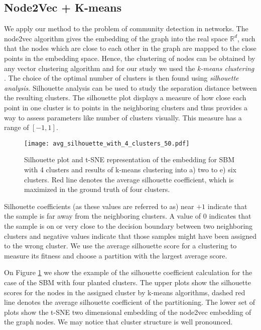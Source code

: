 \subsection{Node2Vec + K-means}
We apply our method to the problem of community detection in networks. The node2vec algorithm gives the embedding of the graph into the real space $\mathbb{R}^d$, such that the nodes which are close to each other in the graph are mapped to the close points in the embedding space. Hence, the clustering of nodes can be obtained by any vector clustering algorithm and for our study we used the \textit{k-means clustering} \cite{Macqueen1967}. The choice of the optimal number of clusters is then found using \textit{silhouette analysis}. Silhouette analysis can be used to study the separation distance between the resulting clusters. The silhouette plot displays a measure of how close each point in one cluster is to points in the neighboring clusters and thus provides a way to assess parameters like number of clusters visually. This measure has a range of $[-1, 1]$. 
\begin{figure}[ht]
 \centering
    \texttt{[image: avg\_silhouette\_with\_4\_clusters\_50.pdf]}
   \caption{Silhouette plot and t-SNE representation of the embedding for SBM with 4 clusters and results of k-means clustering into a) two to e) six clusters. Red line denotes the average silhouette coefficient, which is maximized in the ground truth of four clusters.}
   \label{fig:silhouette_example}
 \end{figure}

Silhouette coefficients (as these values are referred to as) near $+1$ indicate that the sample is far away from the neighboring clusters. A value of $0$ indicates that the sample is on or very close to the decision boundary between two neighboring clusters and negative values indicate that those samples might have been assigned to the wrong cluster. We use the average silhouette score for a clustering to measure its fitness and choose a partition with the largest average score. 

On Figure \ref{fig:silhouette_example} we show the example of the silhouette coefficient calculation for the case of the SBM with four planted clusters. The upper plots show the silhouette scores for the nodes in the assigned cluster by k-means algorithms, dashed red line denotes the average silhouette coefficient of the partitioning. The lower set of plots show the t-SNE two dimensional embedding of the node2vec embedding of the graph nodes. We may notice that cluster structure is well pronounced. 

